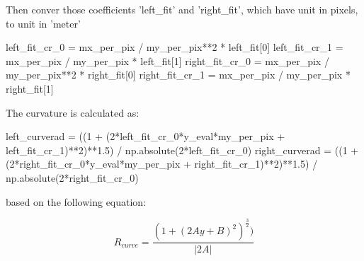 \documentclass[11pt]{article}
\newenvironment{Shaded}{}{}
\newcommand{\DecValTok}[1]{\textcolor[rgb]{0.25,0.63,0.44}{{#1}}}
\newcommand{\FloatTok}[1]{\textcolor[rgb]{0.25,0.63,0.44}{{#1}}}
\newcommand{\NormalTok}[1]{{#1}}
\newcommand{\OperatorTok}[1]{\textcolor[rgb]{0.40,0.40,0.40}{{#1}}}
\begin{document}
Then conver those coefficients 'left\_fit' and 'right\_fit', which have
unit in pixels, to unit in 'meter'

\begin{Shaded}
\begin{Highlighting}[]
\NormalTok{left_fit_cr_0 }\OperatorTok{=}\NormalTok{ mx_per_pix }\OperatorTok{/}\NormalTok{ my_per_pix}\OperatorTok{**}\DecValTok{2} \OperatorTok{*}\NormalTok{ left_fit[}\DecValTok{0}\NormalTok{]}
\NormalTok{left_fit_cr_1 }\OperatorTok{=}\NormalTok{ mx_per_pix }\OperatorTok{/}\NormalTok{ my_per_pix }\OperatorTok{*}\NormalTok{ left_fit[}\DecValTok{1}\NormalTok{]}
\NormalTok{right_fit_cr_0 }\OperatorTok{=}\NormalTok{ mx_per_pix }\OperatorTok{/}\NormalTok{ my_per_pix}\OperatorTok{**}\DecValTok{2} \OperatorTok{*}\NormalTok{ right_fit[}\DecValTok{0}\NormalTok{]}
\NormalTok{right_fit_cr_1 }\OperatorTok{=}\NormalTok{ mx_per_pix }\OperatorTok{/}\NormalTok{ my_per_pix }\OperatorTok{*}\NormalTok{ right_fit[}\DecValTok{1}\NormalTok{]    }
\end{Highlighting}
\end{Shaded}

The curvature is calculated as:

\begin{Shaded}
\begin{Highlighting}[]
\NormalTok{left_curverad }\OperatorTok{=}\NormalTok{ ((}\DecValTok{1} \OperatorTok{+}\NormalTok{ (}\DecValTok{2}\OperatorTok{*}\NormalTok{left_fit_cr_0}\OperatorTok{*}\NormalTok{y_eval}\OperatorTok{*}\NormalTok{my_per_pix }\OperatorTok{+}\NormalTok{ left_fit_cr_1)}\OperatorTok{**}\DecValTok{2}\NormalTok{)}\OperatorTok{**}\FloatTok{1.5}\NormalTok{) }\OperatorTok{/}\NormalTok{ np.absolute(}\DecValTok{2}\OperatorTok{*}\NormalTok{left_fit_cr_0)}
\NormalTok{right_curverad }\OperatorTok{=}\NormalTok{ ((}\DecValTok{1} \OperatorTok{+}\NormalTok{ (}\DecValTok{2}\OperatorTok{*}\NormalTok{right_fit_cr_0}\OperatorTok{*}\NormalTok{y_eval}\OperatorTok{*}\NormalTok{my_per_pix }\OperatorTok{+}\NormalTok{ right_fit_cr_1)}\OperatorTok{**}\DecValTok{2}\NormalTok{)}\OperatorTok{**}\FloatTok{1.5}\NormalTok{) }\OperatorTok{/}\NormalTok{ np.absolute(}\DecValTok{2}\OperatorTok{*}\NormalTok{right_fit_cr_0)}
\end{Highlighting}
\end{Shaded}

based on the following equation:

\begin{equation*}
R_{curve} =\frac{(1+(2Ay+B)^2)^{\frac32})}{|2A|}
\end{equation*}
\end{document}
